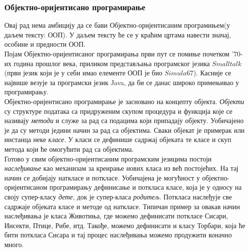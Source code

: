 \documentclass[11pt, serbianc, english, titlepage]{article}
\begin{document}
		\subsubsection{Објектно-оријентисано програмирање}
		Овај рад нема амбицију да се бави Објектно-оријентисаним програмињем(у даљем тексту: ООП). У даљем тексту ће се у краћим цртама навести значај, особине и предности ООП. \\
	Појам Објектно-оријентисаног програмирања први пут се помиње почетком '70-их година прошлог века, приликом представљања програмског језика $Smalltalk$ (први језик који је у себи имао елементе ООП је био $Simula67$). Касније се највише везује за програмски језик Java, да би се данас широко примењивао у програмирању. \\
	     Објектно-оријентисано програмирање је засновано на концепту објекта. \emph{Објекти} су структуре података са придруженим скупом процедура и функција које се називају \emph{методи} и служе за рад са подацима који припадају објекту. Уобичајено је да су методи једини начин за рад са објектима. Сваки објекат је примерак или инстанца неке \emph{класе}. У класи се дефинише садржај објеката те класе и скуп метода који ће омогућити рад са објектима.\\
	     Готово у свим објектно-оријентисаним програмским језицима постоји \emph{наслеђивање} као механизам за креирање нових класа из већ постојећих. На тај начин се добијају наткласе и поткласе. 
		 Уобичајена је могућност у објектно-оријентисаном програмирању дефинисање и поткласа класе, која је у односу на своју супер-класу \emph{дете}, док је супер-класа \emph{родитељ}. Поткласа наслеђује све садржаје објеката класе и методе од наткласе. Типичан пример за овакав начин наслеђивања је класа Животиња, где можемо дефинисати поткласе Сисари, Инсекти, Птице, Рибе, итд. Такође, можемо дефинисати и класу Торбари, која ће бити поткласа Сисара и тај процес наслеђивања можемо продужити коначно много. 
\end{document}
